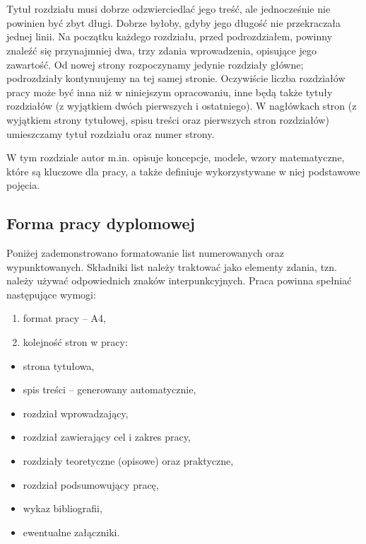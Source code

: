 \chapter{}

Tytuł rozdziału musi dobrze odzwierciedlać jego treść, ale jednocześnie nie powinien być zbyt długi. Dobrze byłoby, gdyby jego długość nie przekraczała jednej linii. Na początku każdego rozdziału, przed podrozdziałem, powinny znaleźć się przynajmniej dwa, trzy zdania wprowadzenia, opisujące jego zawartość. Od nowej strony rozpoczynamy jedynie rozdziały główne; podrozdziały kontynuujemy na tej samej stronie. Oczywiście liczba rozdziałów pracy może być inna niż w niniejszym opracowaniu, inne będą także tytuły rozdziałów (z wyjątkiem dwóch pierwszych i ostatniego). W nagłówkach stron (z wyjątkiem strony tytułowej, spisu treści oraz pierwszych stron rozdziałów) umieszczamy tytuł rozdziału oraz numer strony.

W tym rozdziale autor m.in. opisuje koncepcje, modele, wzory matematyczne, które są kluczowe dla pracy, a także definiuje wykorzystywane w niej podstawowe pojęcia.

\section{Forma pracy dyplomowej}

Poniżej zademonstrowano formatowanie list numerowanych oraz wypunktowanych. Składniki list należy traktować jako elementy zdania, tzn. należy używać odpowiednich znaków interpunkcyjnych. Praca powinna spełniać następujące wymogi:

\begin{enumerate}
  \item format pracy – A4,
  \item kolejność stron w pracy:
\end{enumerate}

\begin{itemize}
  \item strona tytułowa,
  \item spis treści – generowany automatycznie,
  \item rozdział wprowadzający,
  \item rozdział zawierający cel i zakres pracy,
  \item rozdziały teoretyczne (opisowe) oraz praktyczne,
  \item rozdział podsumowujący pracę,
  \item wykaz bibliografii,
  \item ewentualne załączniki.
\end{itemize}

